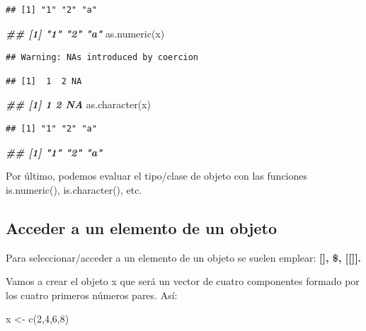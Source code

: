 \documentclass[
]{book}
\newenvironment{Shaded}{\begin{snugshade}}{\end{snugshade}}
\newcommand{\DecValTok}[1]{\textcolor[rgb]{0.00,0.00,0.81}{#1}}
\newcommand{\DocumentationTok}[1]{\textcolor[rgb]{0.56,0.35,0.01}{\textbf{\textit{#1}}}}
\newcommand{\FunctionTok}[1]{\textcolor[rgb]{0.00,0.00,0.00}{#1}}
\newcommand{\NormalTok}[1]{#1}
\newcommand{\OtherTok}[1]{\textcolor[rgb]{0.56,0.35,0.01}{#1}}
\begin{document}
\begin{verbatim}
## [1] "1" "2" "a"
\end{verbatim}

\begin{Shaded}
\begin{Highlighting}[]
\DocumentationTok{\#\# [1] "1" "2" "a"}
\FunctionTok{as.numeric}\NormalTok{(x)}
\end{Highlighting}
\end{Shaded}

\begin{verbatim}
## Warning: NAs introduced by coercion
\end{verbatim}

\begin{verbatim}
## [1]  1  2 NA
\end{verbatim}

\begin{Shaded}
\begin{Highlighting}[]
\DocumentationTok{\#\# [1]  1  2 NA}
\FunctionTok{as.character}\NormalTok{(x)}
\end{Highlighting}
\end{Shaded}

\begin{verbatim}
## [1] "1" "2" "a"
\end{verbatim}

\begin{Shaded}
\begin{Highlighting}[]
\DocumentationTok{\#\# [1] "1" "2" "a"}
\end{Highlighting}
\end{Shaded}

Por último, podemos evaluar el tipo/clase de objeto con las funciones is.numeric(), is.character(), etc.

\hypertarget{acceder-a-un-elemento-de-un-objeto}{%
\subsection{Acceder a un elemento de un objeto}\label{acceder-a-un-elemento-de-un-objeto}}

Para seleccionar/acceder a un elemento de un objeto se suelen emplear: \textbf{{[}{]}, \$, {[}{[}{]}{]}.}

Vamos a crear el objeto x que será un vector de cuatro componentes formado por los cuatro primeros números pares. Así:

\begin{Shaded}
\begin{Highlighting}[]
\NormalTok{x }\OtherTok{\textless{}{-}} \FunctionTok{c}\NormalTok{(}\DecValTok{2}\NormalTok{,}\DecValTok{4}\NormalTok{,}\DecValTok{6}\NormalTok{,}\DecValTok{8}\NormalTok{)}
\end{Highlighting}
\end{Shaded}
\end{document}
